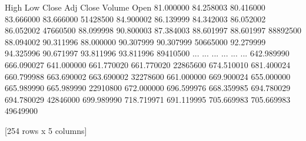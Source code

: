 \documentclass[letterpaper,10pt,english]{jupyterBook}
\begin{document}
\begin{sphinxVerbatim}[commandchars=\\\{\}]
                  High         Low       Close   Adj Close    Volume
Open                                                                
81.000000    84.258003   80.416000   83.666000   83.666000  51428500
84.900002    86.139999   84.342003   86.052002   86.052002  47660500
88.099998    90.800003   87.384003   88.601997   88.601997  88892500
88.094002    90.311996   88.000000   90.307999   90.307999  50665000
92.279999    94.325996   90.671997   93.811996   93.811996  89410500
...                ...         ...         ...         ...       ...
642.989990  666.090027  641.000000  661.770020  661.770020  22865600
674.510010  681.400024  660.799988  663.690002  663.690002  32278600
661.000000  669.900024  655.000000  665.989990  665.989990  22910800
672.000000  696.599976  668.359985  694.780029  694.780029  42846000
699.989990  718.719971  691.119995  705.669983  705.669983  49649900

[254 rows x 5 columns]
\end{sphinxVerbatim}

\begin{sphinxVerbatim}[commandchars=\\\{\}]
\PYG{p}{[}\PYG{p}{]}
\end{sphinxVerbatim}
\end{document}
